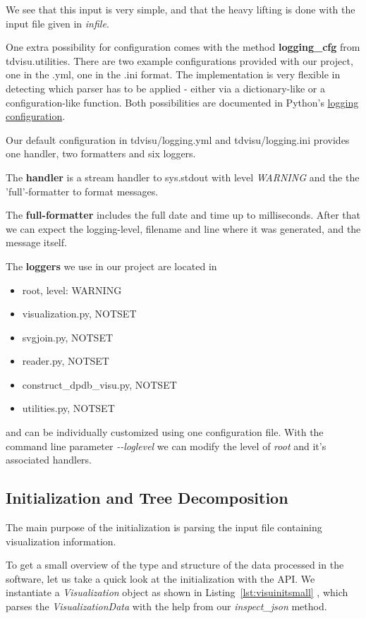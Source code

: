 \documentclass[a4paper, 12pt, bibliography=totoc]{scrartcl}
\begin{document}
We see that this input is very simple, and that the heavy lifting is done with the input file given in \textit{infile}.

One extra possibility for configuration comes with the method \textbf{logging\_cfg} from {tdvisu.utilities}. There are two example configurations provided with our project, one in the .yml, one in the .ini format. The implementation is very flexible in detecting which parser has to be applied - either via a dictionary-like or a configuration-like function. Both possibilities are documented in Python's \href{docs.python.org/3/library/logging.config.html#logging-config-api}{logging configuration}.

Our default configuration in tdvisu/logging.yml and tdvisu/logging.ini provides one handler, two formatters and six loggers.

The \textbf{handler} is a stream handler to sys.stdout with level \textit{WARNING} and the the 'full'-formatter to format messages.

The \textbf{full-formatter} includes the full date and time up to milliseconds. After that we can expect the logging-level, filename and line where it was generated, and the message itself.

The \textbf{loggers} we use in our project are located in 
\begin{itemize}
	\item root, level: WARNING
	\item visualization.py, NOTSET
	\item svgjoin.py, NOTSET
    \item reader.py, NOTSET
	\item construct\_dpdb\_visu.py, NOTSET
	\item utilities.py, NOTSET
\end{itemize}
and can be individually customized using one configuration file.
With the command line parameter \textit{-{}-loglevel} we can modify the level of \textit{root} and it's associated handlers.

\subsection{Initialization and Tree Decomposition}

The main purpose of the initialization is parsing the input file containing visualization information.

To get a small overview of the type and structure of the data processed in the software, let us take a quick look at the initialization with the API. We instantiate a \textit{Visualization} object as shown in Listing~\ref{lst:visuinitsmall} , which parses the \textit{VisualizationData} with the help from our \textit{inspect\_json} method. 
\end{document}
